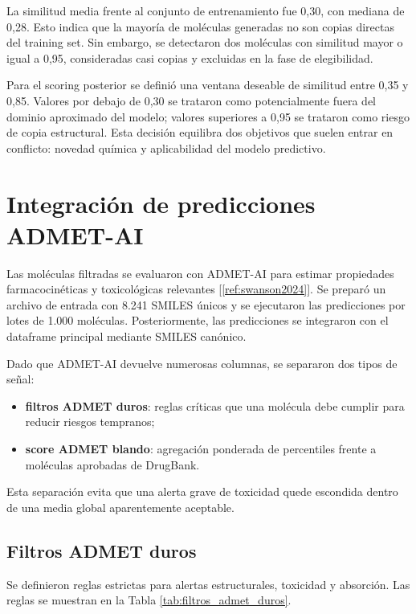 \documentclass[IB]{TFUOC}%
\begin{document}
La similitud media frente al conjunto de entrenamiento fue 0,30, con mediana de 0,28. Esto indica que la mayoría de moléculas generadas no son copias directas del training set. Sin embargo, se detectaron dos moléculas con similitud mayor o igual a 0,95, consideradas casi copias y excluidas en la fase de elegibilidad.

Para el scoring posterior se definió una ventana deseable de similitud entre 0,35 y 0,85. Valores por debajo de 0,30 se trataron como potencialmente fuera del dominio aproximado del modelo; valores superiores a 0,95 se trataron como riesgo de copia estructural. Esta decisión equilibra dos objetivos que suelen entrar en conflicto: novedad química y aplicabilidad del modelo predictivo.

\section{Integración de predicciones ADMET-AI}

Las moléculas filtradas se evaluaron con ADMET-AI para estimar propiedades farmacocinéticas y toxicológicas relevantes [\ref{ref:swanson2024}]. Se preparó un archivo de entrada con 8.241 SMILES únicos y se ejecutaron las predicciones por lotes de 1.000 moléculas. Posteriormente, las predicciones se integraron con el dataframe principal mediante SMILES canónico.

Dado que ADMET-AI devuelve numerosas columnas, se separaron dos tipos de señal:

\begin{itemize}
    \item \textbf{filtros ADMET duros}: reglas críticas que una molécula debe cumplir para reducir riesgos tempranos;
    \item \textbf{score ADMET blando}: agregación ponderada de percentiles frente a moléculas aprobadas de DrugBank.
\end{itemize}

Esta separación evita que una alerta grave de toxicidad quede escondida dentro de una media global aparentemente aceptable.

\subsection{Filtros ADMET duros}

Se definieron reglas estrictas para alertas estructurales, toxicidad y absorción. Las reglas se muestran en la Tabla \ref{tab:filtros_admet_duros}.
\end{document}
